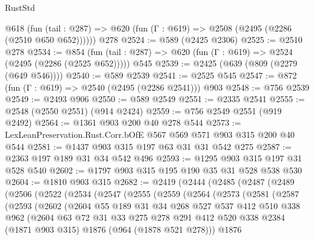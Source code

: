 \begin{lexlean}{RustStd}
\begin{coremodule}
    @618 (fun (tail : @287) => @620 (fun (Γ : @619) => @2508 (@2495 (@2286 (@2510 @650 @652))))))
    @278
@2524 := @589 (@2425 @2306)
@2525 := @2510 @278
@2534 := @854
    (fun (tail : @287) => @620 (fun (Γ : @619) => @2524 (@2495 (@2286 (@2525 @652)))))
    @545
@2539 := @2425 (@639 (@809 (@2279 (@649 @546))))
@2540 := @589 @2539
@2541 := @2525 @545
@2547 := @872 (fun (Γ : @619) => @2540 (@2495 (@2286 @2541))) @903
@2548 := @756 @2539
@2549 := @2493 @906
@2550 := @589 @2549
@2551 := @2335 @2541
@2555 := @2548 (@2550 @2551) (@914 @2424)
@2559 := @756 @2549 @2551 (@919 @2492)
@2564 := @1361 @903 @200 @40 @278 @544
@2573 := LexLeanPreservation.Rust.Corr.bOfE @567 @569 @571 @903 @315 @200 @40 @544
@2581 := @1437 @903 @315 @197 @63 @31 @31 @542 @275
@2587 := @2363 @197 @189 @31 @34 @542 @496
@2593 := @1295 @903 @315 @197 @31 @528 @540
@2602 := @1797 @903 @315 @195 @190 @35 @31 @528 @538 @530
@2604 := @1810 @903 @315
@2682 := @2419
    (@2444
      (@2485
        (@2487
          (@2489
            (@2506
              (@2522
                (@2534
                  (@2547
                    (@2555
                      (@2559
                        (@2564
                          (@2573
                            (@2581
                              (@2587
                                (@2593
                                  (@2602
                                    (@2604
                                      @55
                                      @189
                                      @31
                                      @34
                                      @268
                                      @527
                                      @537
                                      @412
                                      @510
                                      @338
                                      @962
                                      (@2604
                                        @63
                                        @72
                                        @31
                                        @33
                                        @275
                                        @278
                                        @291
                                        @412
                                        @520
                                        @338
                                        @2384
                                        (@1871 @903 @315)
                                        @1876
                                        (@964 (@1878 @521 @278)))
                                      @1876

\end{coremodule}
\end{lexlean}
